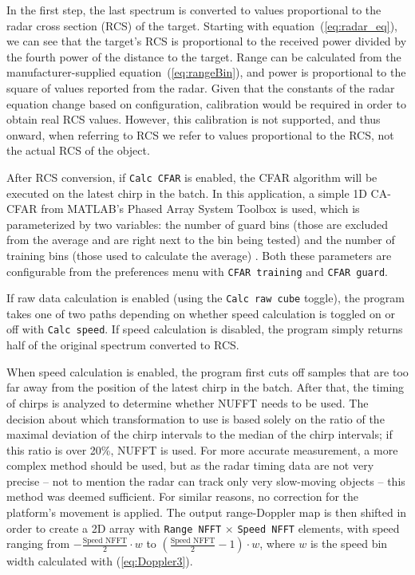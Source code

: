 In the first step, the last spectrum is converted to values proportional to the radar cross section (RCS) of the target.
Starting with equation~(\ref{eq:radar_eq}), we can see that the target's RCS is proportional to the received power divided by the fourth power of the distance to the target.
Range can be calculated from the manufacturer-supplied equation~(\ref{eq:rangeBin}), and power is proportional to the square of values reported from the radar.
Given that the constants of the radar equation change based on configuration, calibration would be required in order to obtain real RCS values.
However, this calibration is not supported, and thus onward, when referring to RCS we refer to values proportional to the RCS, not the actual RCS of the object.

After RCS conversion, if \texttt{Calc CFAR} is enabled, the CFAR algorithm will be executed on the latest chirp in the batch.
In this application, a simple 1D CA-CFAR from MATLAB's Phased Array System Toolbox is used, which is parameterized by two variables: the number of guard bins (those are excluded from the average and are right next to the bin being tested) and the number of training bins (those used to calculate the average) \cite{matlab_cfar}.
Both these parameters are configurable from the preferences menu with \texttt{CFAR training} and \texttt{CFAR guard}.

If raw data calculation is enabled (using the \texttt{Calc raw cube} toggle), the program takes one of two paths depending on whether speed calculation is toggled on or off with \texttt{Calc speed}.
If speed calculation is disabled, the program simply returns half of the original spectrum converted to RCS.

When speed calculation is enabled, the program first cuts off samples that are too far away from the position of the latest chirp in the batch.
After that, the timing of chirps is analyzed to determine whether NUFFT needs to be used.
The decision about which transformation to use is based solely on the ratio of the maximal deviation of the chirp intervals to the median of the chirp intervals; if this ratio is over 20\%, NUFFT is used.
For more accurate measurement, a more complex method should be used, but as the radar timing data are not very precise -- not to mention the radar can track only very slow-moving objects -- this method was deemed sufficient.
For similar reasons, no correction for the platform's movement is applied.
The output range-Doppler map is then shifted in order to create a 2D array with \texttt{Range NFFT} $\times$ \texttt{Speed NFFT} elements, with speed ranging from $-\frac{\text{Speed NFFT}}{2}\cdot w $ to  $\left(\frac{\text{Speed NFFT}}{2}-1\right)\cdot w $, where $w$ is the speed bin width calculated with (\ref{eq:Doppler3}).


